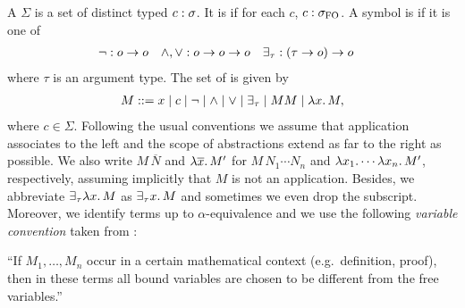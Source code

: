 \documentclass[a4paper,twoside,notitlepage,openright,11pt]{report}
\begin{document}
A  $\Sigma$ is a set of distinct typed  $c:\sigma$. It is  if for each $c$, $c:\sigma_{\operatorname{{FO}}}$. A symbol is  if it is one of
\begin{align*}
  \neg&: o\to o&\land,\lor&: o\to o\to o&\exists_\tau&: (\tau\to o)\to o
\end{align*}
where $\tau$ is an argument type. The set of  is given by
\begin{align*}
  M::=x\mid c\mid\neg\mid\land\mid\lor\mid\exists_\tau\mid MM\mid\lambda x\ldotp M,
\end{align*}
where $c\in\Sigma$.
Following the usual conventions we assume that application associates to the left and the scope of abstractions extend as far to the right as possible.
We also write $M\,\overline N$ and $\lambda\overline x\ldotp M'$ for $M\,N_1\cdots N_n$ and $\lambda x_1\ldotp\cdots\lambda x_n\ldotp M'$, respectively, assuming implicitly that $M$ is not an application.
Besides, we abbreviate $\exists_\tau\lambda x\ldotp M$ as $\exists_\tau x\ldotp M$ and sometimes we even drop the subscript. 
Moreover, we identify terms up to $\alpha$-equivalence and we use the following \emph{variable convention} taken from \cite{B12}:
\begin{convention}[Variables]
  \label{con:vars}
  ``If $M_1,\ldots,M_n$ occur in a certain mathematical context (e.g.\ definition, proof), then in these terms all bound variables are chosen to be different from the free variables.''
\end{convention}
\end{document}
